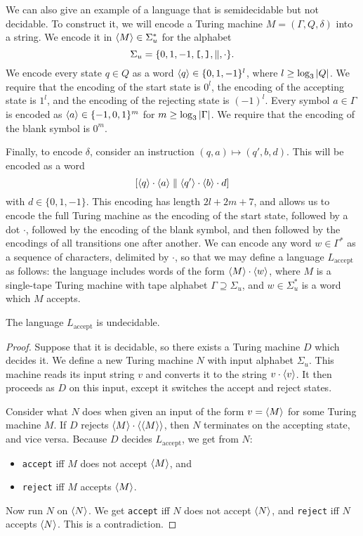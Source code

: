 We can also give an example of a language that is semidecidable but not
decidable.
To construct it, we will encode a Turing machine $M = (\Gamma, Q, \delta)$ into
a string.
We encode it in $\left< M \right> \in \Sigma_u^*$ for the alphabet
\[
  \Sigma_u = \{0, 1, -1, \verb+[+, \verb+]+, \parallel, \cdot\}.
\]
We encode every state $q \in Q$ as a word $\left< q \right> \in \{0, 1, -1\}^l$, where $l
\ge \log_3 \left| Q \right|$.
We require that the encoding of the start state is $0^l$, the encoding of the
accepting state is $1^l$, and the encoding of the rejecting state is $(-1)^l$.
Every symbol $a \in \Gamma$ is encoded as $\left< a \right> \in \{-1, 0, 1\}^m$ for $m \ge
\log_3 \left| \Gamma \right|$.
We require that the encoding of the blank symbol is $0^m$.

Finally, to encode $\delta$, consider an instruction $(q, a) \mapsto (q', b,
d)$.
This will be encoded as a word
\[
  [\left< q \right> \cdot \left< a \right> \parallel \left< q' \right> \cdot \left< b \right> \cdot d]
\]
with $d \in \{0, 1, -1\}$.
This encoding has length $2l + 2m + 7$, and allows us to encode the full Turing
machine as the encoding of the start state, followed by a dot $\cdot$, followed
by the encoding of the blank symbol, and then followed by the encodings of all
transitions one after another.
We can encode any word $w \in \Gamma^*$ as a sequence of characters, delimited
by $\cdot$, so that we may define a language $L_{\text{accept}}$ as follows:
the language includes words of the form $\left< M \right> \cdot \left< w \right>$, where $M$ is a
single-tape Turing machine with tape alphabet $\Gamma \supseteq \Sigma_u$, and
$w \in \Sigma_u^*$ is a word which $M$ accepts.


\begin{theorem}
  The language $L_{\text{accept}}$ is undecidable.
\end{theorem}

\begin{proof}
  Suppose that it is decidable, so there exists a Turing machine $D$ which
  decides it.
  We define a new Turing machine $N$ with input alphabet $\Sigma_u$.
  This machine reads its input string $v$ and converts it to the string $v \cdot
  \left< v \right>$.
  It then proceeds as $D$ on this input, except it switches the accept and
  reject states.

  Consider what $N$ does when given an input of the form $v = \left< M \right>$ for some
  Turing machine $M$.
  If $D$ rejects $\left< M \right> \cdot \left< \left< M \right> \right>$, then $N$ terminates on the
  accepting state, and vice versa.
  Because $D$ decides $L_{\text{accept}}$, we get from $N$:
  \begin{itemize}
  \item \texttt{accept} iff $M$ does not accept $\left< M \right>$, and
  \item \texttt{reject} iff $M$ accepts $\left< M \right>$.
  \end{itemize}
  Now run $N$ on $\left< N \right>$.
  We get \texttt{accept} iff $N$ does not accept $\left< N \right>$, and \texttt{reject}
  iff $N$ accepts $\left< N \right>$.
  This is a contradiction.
\end{proof}

